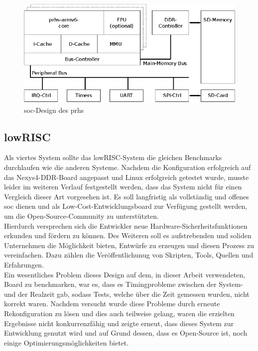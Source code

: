 \begin{figure}[H]
\centering
\includegraphics[width=1\textwidth]{Hauptteil/prhs.eps}
\caption{\ac{soc}-Design des \ac{prhs}}
\label{fig:prhs}
\end{figure}


\subsection{lowRISC}\label{kap:lowrisc}
Als viertes System sollte das lowRISC-System die gleichen Benchmarks durchlaufen wie die anderen Systeme. Nachdem die Konfiguration erfolgreich auf das Nexys4-DDR-Board angepasst
und Linux erfolgreich getestet wurde, musste leider im weiteren Verlauf festgestellt werden, dass das System nicht für einen Vergleich dieser Art vorgesehen ist. Es soll langfristig als vollständig
und offenes \ac{soc} dienen und als Low-Cost-Entwicklungsboard zur Verfügung gestellt werden, um die Open-Source-Community zu unterstützten.\\
Hierdurch versprechen sich die Entwickler neue Hardware-Sicherheitsfunktionen erkunden und fördern zu können. Des Weiteren soll es aufstrebenden und soliden Unternehmen die Möglichkeit bieten,
Entwürfe zu erzeugen und diesen Prozess zu vereinfachen. Dazu zählen die Veröffentlichunug von Skripten, Tools, Quellen und Erfahrungen.\\
Ein wesentliches Problem dieses Design auf dem, in dieser Arbeit verwendeten, Board zu benchmarken, war es, dass es Timingprobleme zwischen der System- und der Realzeit gab, sodass Tests,
welche über die Zeit gemessen wurden, nicht korrekt waren. Nachdem versucht wurde diese Probleme durch erneute Rekonfiguration zu lösen und dies auch teilweise gelang, waren die erzielten Ergebnisse
nicht konkurrenzfähig und zeigte erneut, dass dieses System zur Entwicklung genutzt wird und auf Grund dessen, dass es Open-Source ist, noch einige Optimierungsmöglichkeiten bietet.\\

